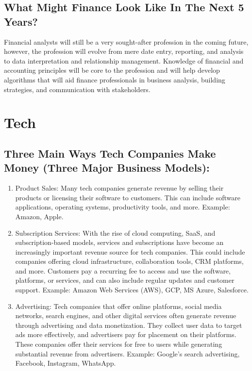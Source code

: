\documentclass[
]{article}
\begin{document}
\hypertarget{what-might-finance-look-like-in-the-next-5-years}{%
\subsection{What Might Finance Look Like In The Next 5 Years?}\label{what-might-finance-look-like-in-the-next-5-years}}

Financial analysts will still be a very sought-after profession in the coming future, however, the profession will evolve from mere date entry, reporting, and analysis to data interpretation and relationship management. Knowledge of financial and accounting principles will be core to the profession and will help develop algorithms that will aid finance professionals in business analysis, building strategies, and communication with stakeholders.

\hypertarget{tech}{%
\section{Tech}\label{tech}}

\hypertarget{three-main-ways-tech-companies-make-money-three-major-business-models}{%
\subsection{Three Main Ways Tech Companies Make Money (Three Major Business Models):}\label{three-main-ways-tech-companies-make-money-three-major-business-models}}

\begin{enumerate}
\def\labelenumi{\arabic{enumi}.}
\item
  Product Sales: Many tech companies generate revenue by selling their products or licensing their software to customers. This can include software applications, operating systems, productivity tools, and more.
  Example: Amazon, Apple.
\item
  Subscription Services: With the rise of cloud computing, SaaS, and subscription-based models, services and subscriptions have become an increasingly important revenue source for tech companies. This could include companies offering cloud infrastructure, collaboration tools, CRM platforms, and more. Customers pay a recurring fee to access and use the software, platforms, or services, and can also include regular updates and customer support.
  Example: Amazon Web Services (AWS), GCP, MS Azure, Salesforce.
\item
  Advertising: Tech companies that offer online platforms, social media networks, search engines, and other digital services often generate revenue through advertising and data monetization. They collect user data to target ads more effectively, and advertisers pay for placement on their platforms. These companies offer their services for free to users while generating substantial revenue from advertisers. Example: Google's search advertising, Facebook, Instagram, WhatsApp.
\end{enumerate}
\end{document}
